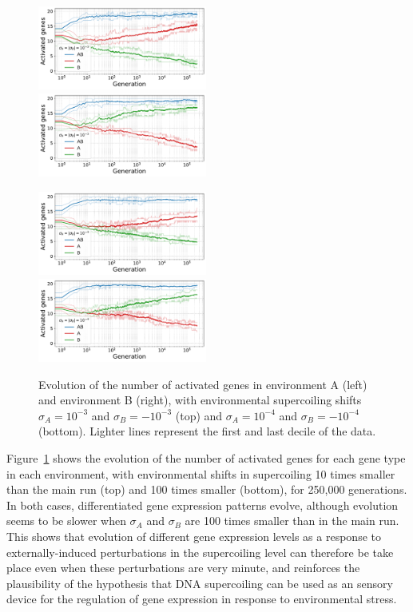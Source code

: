 \begin{figure}[H]
\centering
\includegraphics[width=0.495\textwidth]{param/sigma/sigma-1e-3/gene_activity_env_A.pdf}
\includegraphics[width=0.495\textwidth]{param/sigma/sigma-1e-3/gene_activity_env_B.pdf}

\includegraphics[width=0.495\textwidth]{param/sigma/sigma-1e-4/gene_activity_env_A.pdf}
\includegraphics[width=0.495\textwidth]{param/sigma/sigma-1e-4/gene_activity_env_B.pdf}
\caption[Evolution of the number of activated genes in each environment, with decreasing environmental supercoiling shifts]{Evolution of the number of activated genes in environment A (left) and environment B (right), with environmental supercoiling shifts $\sigma_A = 10^{-3}$ and $\sigma_B = -10^{-3}$ (top) and $\sigma_A = 10^{-4}$ and $\sigma_B = -10^{-4}$ (bottom).
Lighter lines represent the first and last decile of the data.}
\label{fig:param:sigma-activ-by-env}
\end{figure}

Figure~\ref{fig:param:sigma-activ-by-env} shows the evolution of the number of activated genes for each gene type in each environment, with environmental shifts in supercoiling 10 times smaller than the main run (top) and 100 times smaller (bottom), for 250,000 generations.
In both cases, differentiated gene expression patterns evolve, although evolution seems to be slower when $\sigma_A$ and $\sigma_B$ are 100 times smaller than in the main run.
This shows that evolution of different gene expression levels as a response to externally-induced perturbations in the supercoiling level can therefore be take place even when these perturbations are very minute, and reinforces the plausibility of the hypothesis that DNA supercoiling can be used as an sensory device for the regulation of gene expression in response to environmental stress.


